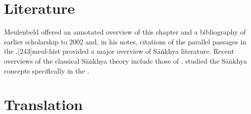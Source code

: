 \section{Literature} 

Meulenbeld offered an annotated overview of this chapter and a
bibliography of earlier scholarship to 2002 and, in his notes,
citations of the parallel passages in the
\CS.[243]{meul-hist}  \citet{lars-1987} provided a major
overview of Sāṅkhya literature. Recent overviews of the classical
Sāṅkhya theory include those of
\textcites[\S2.4]{chat-2021}[ch.\,22]{adam-2022}{ruzs-2025}.
\citet[54--56]{comb-2011} studied the Sāṅkhya concepts specifically in
the \SS.


\cleardoublepage

\section{Translation}

